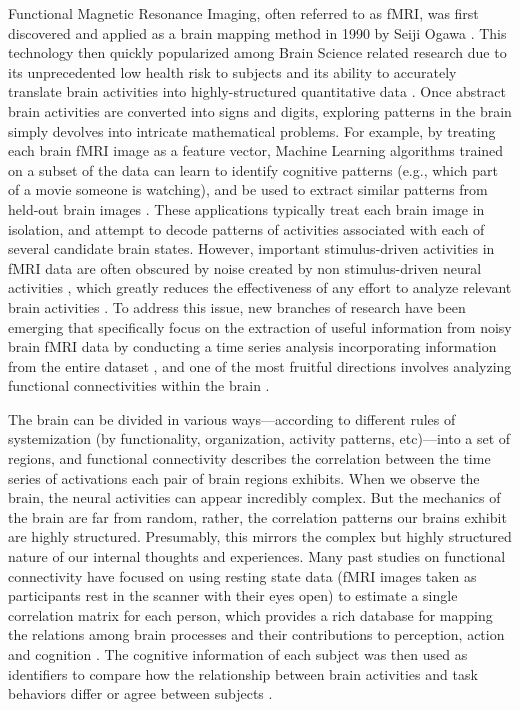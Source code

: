 \documentclass[11pt]{article}
\begin{document}
Functional Magnetic Resonance Imaging, often referred to as fMRI, was first discovered and applied as a brain mapping method in 1990 by Seiji Ogawa \citep{Ogawa90}. This technology then quickly popularized among Brain Science related research due to its unprecedented low health risk to subjects and its ability to accurately translate brain activities into highly-structured quantitative data \citep{Logothetis01,Friston99,Friston98}. Once abstract brain activities are converted into signs and digits, exploring patterns in the brain simply devolves into intricate mathematical problems. For example, by treating each brain fMRI image as a feature vector, Machine Learning algorithms trained on a subset of the data can learn to identify cognitive patterns (e.g., which part of a movie someone is watching), and be used to extract similar patterns from held-out brain images \citep{Norman06,peterson12,peterson17}. These applications typically treat each brain image in isolation, and attempt to decode patterns of activities associated with each of several candidate brain states. However, important stimulus-driven activities in fMRI data are often obscured by noise created by non stimulus-driven neural activities \citep{peterson11}, which greatly reduces the effectiveness of any effort to analyze relevant brain activities \citep{hasson2009}. To address this issue, new branches of research have been emerging that specifically focus on the extraction of useful information from noisy brain fMRI data by conducting a time series analysis incorporating information from the entire dataset \citep{tang2017}, and one of the most fruitful directions involves analyzing functional connectivities within the brain \citep{peterson19} \citep{peterson20}.

The brain can be divided in various ways---according to different rules of systemization (by functionality, organization, activity patterns, etc)---into a set of regions, and functional connectivity describes the correlation between the time series of activations each pair of brain regions exhibits. When we observe the brain, the neural activities can appear incredibly complex. But the mechanics of the brain are far from random, rather, the correlation patterns our brains exhibit are highly structured. Presumably, this mirrors the complex but highly structured nature of our internal thoughts and experiences. Many past studies on functional connectivity have focused on using resting state data (fMRI images taken as participants rest in the scanner with their eyes open) to estimate a single correlation matrix for each person, which provides a rich database for mapping the relations among brain processes and their contributions to perception, action and cognition \citep{peterson9,Bassett2017}. The cognitive information of each subject was then used as identifiers to compare how the relationship between brain activities and task behaviors differ or agree between subjects \citep{Turke13,Rubinov2010,peterson10}.
\end{document}
